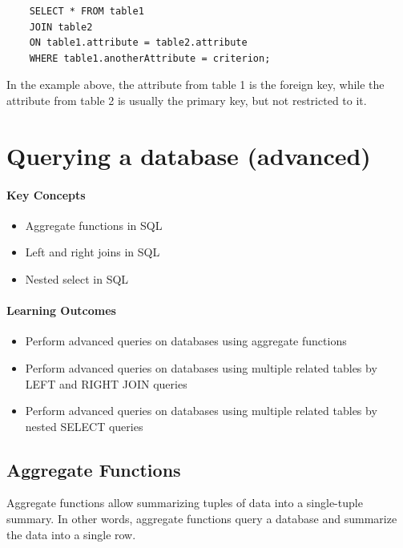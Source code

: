 \begin{verbatim}
	SELECT * FROM table1
	JOIN table2
	ON table1.attribute = table2.attribute
	WHERE table1.anotherAttribute = criterion;
\end{verbatim}

In the example above, the attribute from table 1 is the foreign key, while the attribute from table 2 is usually the primary key, but not restricted to it.

\section{Querying a database (advanced)}

\begin{mdframed}

\paragraph{Key Concepts}
\begin{itemize}[label={\checkmark}]
\item Aggregate functions in SQL
\item Left and right joins in SQL
\item Nested select in SQL
\end{itemize}

\paragraph{Learning Outcomes}
\begin{itemize}[label={\checkmark}]
\item Perform advanced queries on databases using aggregate functions
\item Perform advanced queries on databases using multiple related tables by LEFT and RIGHT JOIN queries
\item Perform advanced queries on databases using multiple related tables by nested SELECT queries
\end{itemize}
\end{mdframed}

\subsection{Aggregate Functions}
Aggregate functions allow summarizing tuples of data into a single-tuple summary. In other words, aggregate functions query a database and summarize the data into a single row.

